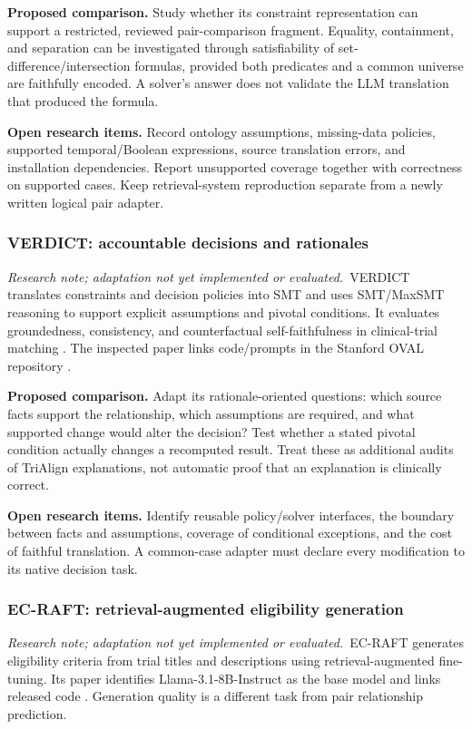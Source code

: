 \documentclass[10pt,letterpaper]{article}
\newcommand{\research}{\textit{Research note; adaptation not yet implemented or evaluated.}}
\begin{document}
\textbf{Proposed comparison.} Study whether its constraint representation
can support a restricted, reviewed pair-comparison fragment. Equality,
containment, and separation can be investigated through satisfiability of
set-difference/intersection formulas, provided both predicates and a common
universe are faithfully encoded. A solver's answer does not validate the
LLM translation that produced the formula.

\textbf{Open research items.} Record ontology assumptions, missing-data
policies, supported temporal/Boolean expressions, source translation
errors, and installation dependencies. Report unsupported coverage together
with correctness on supported cases. Keep retrieval-system reproduction
separate from a newly written logical pair adapter.

\subsubsection{VERDICT: accountable decisions and rationales}
\research\ VERDICT translates constraints and decision policies into SMT
and uses SMT/MaxSMT reasoning to support explicit assumptions and pivotal
conditions. It evaluates groundedness, consistency, and counterfactual
self-faithfulness in clinical-trial matching \cite{verdict}. The inspected
paper links code/prompts in the Stanford OVAL repository \cite{satircode}.

\textbf{Proposed comparison.} Adapt its rationale-oriented questions:
which source facts support the relationship, which assumptions are required,
and what supported change would alter the decision? Test whether a stated
pivotal condition actually changes a recomputed result. Treat these as
additional audits of TriAlign explanations, not automatic proof that an
explanation is clinically correct.

\textbf{Open research items.} Identify reusable policy/solver interfaces,
the boundary between facts and assumptions, coverage of conditional
exceptions, and the cost of faithful translation. A common-case adapter must
declare every modification to its native decision task.

\subsubsection{EC-RAFT: retrieval-augmented eligibility generation}
\research\ EC-RAFT generates eligibility criteria from trial titles and
descriptions using retrieval-augmented fine-tuning. Its paper identifies
Llama-3.1-8B-Instruct as the base model and links released code \cite{ecraft}.
Generation quality is a different task from pair relationship prediction.
\end{document}
